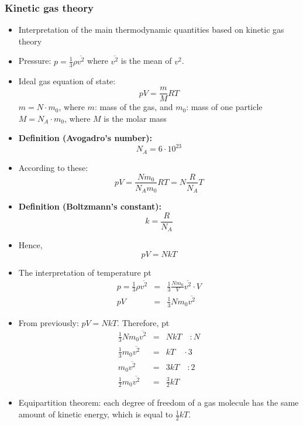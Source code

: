 \documentclass[t,aspectratio=169]{beamer}
\begin{document}
\begin{frame}
\frametitle{Kinetic gas theory}

\begin{itemize}
\setlength{\parskip}{0pt}
\setlength{\itemsep}{4pt}

\item Interpretation of the main thermodynamic quantities based on kinetic gas theory

\item Pressure: $p = \frac{1}{3} \rho \overline{v^2}$ where $\overline{v^2}$ is the mean of $v^2$.

\item Ideal gas equation of state: $$pV = \frac{m}{M} RT$$
$m = N \cdot m_0$, where $m$: mass of the gas, and $m_0$: mass of one particle \\
$M = N_A \cdot m_0$, where $M$ is the molar mass

\item \textbf{Definition (Avogadro's number):} $$N_A = 6 \cdot 10^{23}$$

\pagebreak
\item According to these:
$$pV = \frac{N m_0}{N_A m_0} RT = N \frac{R}{N_A} T$$

\item \textbf{Definition (Boltzmann's constant):}
$$k = \frac{R}{N_A}$$

\item Hence,
$$pV = NkT$$

\pagebreak
\item The interpretation of temperature
 pt
\begin{eqnarray*}  
p = \frac{1}{3} \rho \overline{v^2} &=& \frac{1}{3} \frac{N m_0}{V} \overline{v^2} \cdot V\\
pV &=& \frac{1}{3} N m_0 \overline{v^2}
\end{eqnarray*}
\item From previously: $pV = N k T$. Therefore,
 pt
\begin{eqnarray*}
\frac{1}{3} N m_0 \overline{v^2} &=& N k T \quad : N \\
\frac{1}{3} m_0 \overline{v^2} &=& k T \quad \cdot 3 \\
m_0 \overline{v^2} &=& 3 k T \quad : 2 \\
\frac{1}{2} m_0 \overline{v^2} &=& \frac{3}{2} k T
\end{eqnarray*}
  
\framebreak

\item Equipartition theorem: each degree of freedom of a gas molecule has the same amount of kinetic energy, which is equal to $\frac{1}{2} k T$.


\end{itemize}
\end{frame}
\end{document}
